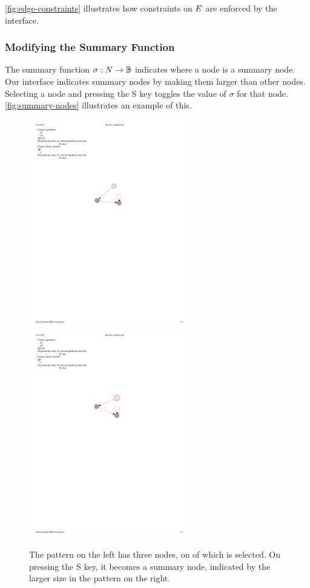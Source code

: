 \autoref{fig:edge-constraints} illustrates how constraints on $E$ are enforced by the interface.

\subsubsection{Modifying the Summary Function}
The summary function $\sigma: N \to \mathbb{B}$ indicates where a node is a summary node. Our interface indicates summary nodes by making them larger than other nodes. Selecting a node and pressing the S key toggles the value of $\sigma$ for that node. \autoref{fig:summary-nodes} illustrates an example of this.

\begin{figure}
  \centering
  \includegraphics[width=7cm]{fig/summary1.pdf}
  \includegraphics[width=7cm]{fig/summary2.pdf}
  \caption{The pattern on the left has three nodes, on of which is selected. On pressing the S key, it becomes a summary node, indicated by the larger size in the pattern on the right.}
  \label{fig:summary-nodes}
\end{figure}

